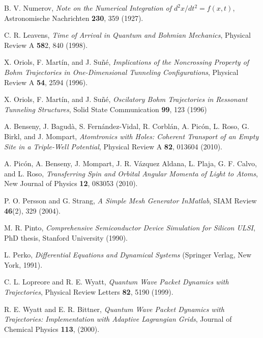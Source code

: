 \documentclass[nofootinbib, secnumarabic, amsmath, nobibnotes,10pt,aps,pra]{revtex4-1}
\begin{document}
\begin{thebibliography}{999}
B. V. Numerov, \emph{Note on the Numerical Integration of $d^2 x/dt^2 = f(x,t)$}, Astronomische Nachrichten \textbf{230},  359 (1927).

C. R. Leavens, \emph{Time of Arrival in Quantum and Bohmian Mechanics}, Physical Review A \textbf{58}2,  840 (1998).

X. Oriols, F. Mart\'{i}n, and J. Su\~{n}\'{e}, \emph{Implications of the Noncrossing Property of Bohm Trajectories in One-Dimensional Tunneling Configurations}, Physical Review A \textbf{54},  2594 (1996).

X. Oriols, F. Mart\'{i}n, and J. Su\~{n}\'{e}, \emph{Oscilatory Bohm Trajectories in Ressonant Tunneling Structures}, Solid State Communication \textbf{99},  123 (1996)

A. Benseny, J. Bagud\` {a}, S. Fern\'{a}ndez-Vidal, R. Corbl\'{a}n, A. Pic\'{o}n, L. Roso, G. Birkl, and J. Mompart, \emph{Atomtronics with Holes: Coherent Transport of an Empty Site in a Triple-Well Potential}, Physical Review A \textbf{82},  013604 (2010).

A. Pic\'{o}n, A. Benseny, J. Mompart, J. R. V\'{a}zquez Aldana, L. Plaja, G. F. Calvo, and L. Roso, \emph{Transferring Spin and Orbital Angular Momenta of Light to Atoms}, New Journal of Physics \textbf{12},  083053 (2010).

P. O. Persson and G. Strang, \emph{A Simple Mesh Generator InMatlab}, SIAM Review \textbf{46}(2),  329 (2004).

M. R. Pinto, \emph{Comprehensive Semiconductor Device Simulation for Silicon ULSI}, PhD thesis, Stanford University (1990).

L. Perko, \emph{Differential Equations and Dynamical Systems} (Springer Verlag, New York, 1991).

C. L. Lopreore and R. E. Wyatt, \emph{Quantum Wave Packet Dynamics with Trajectories}, Physical Review Letters \textbf{82},  5190 (1999).

R. E. Wyatt and E. R. Bittner, \emph{Quantum Wave Packet Dynamics with Trajectories: Implementation with Adaptive Lagrangian Grids}, Journal of Chemical Physics \textbf{113},  (2000).


\end{thebibliography}
\end{document}
